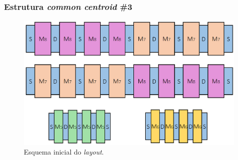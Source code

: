 \documentclass[11pt]{article}
\numberwithin{equation}{section}
\begin{document}
\subsubsection{Estrutura \textit{common centroid} \#3}

\begin{figure}[H]
	\centering
	\includegraphics[keepaspectratio=true, scale=0.30]{teoricas/layout/cc3_1}
	\vspace{-0.5em}
	\caption{Esquema inicial do \textit{layout}.}
	\vspace{-0.8em} 
\end{figure}
\end{document}
